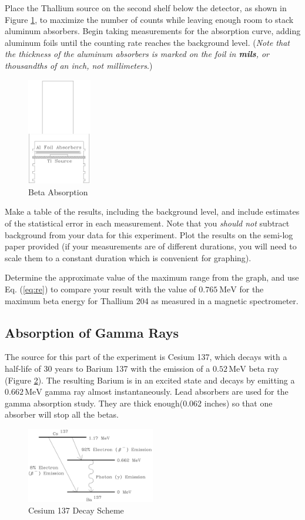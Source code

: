 Place the Thallium source on the second shelf below the detector, as shown in Figure {\ref{fig:absorption}}, to maximize the number of counts while leaving enough room to stack aluminum absorbers. Begin taking measurements for the absorption curve, adding aluminum foils until the counting rate reaches the background level. (\emph{Note that the thickness of the aluminum absorbers is marked on the foil in \textbf{mils}, or thousandths of an inch, not millimeters}.)\myskip
\begin{figure}[h]
\centering
\includegraphics[width=0.25\textwidth]{./Exp10/pic/image8.png}
\caption{Beta Absorption}
\label{fig:absorption}
\end{figure} 

Make a table of the results, including the background level, and include estimates of the statistical error in each measurement. Note that you \emph{should not} subtract background from your data for this experiment. Plot the results on the semi-log paper provided (if your measurements are of different durations, you will need to scale them to a constant duration which is convenient for graphing).\myskip

Determine the approximate value of the maximum range from the graph, and use Eq. ({\ref{eq:re}}) to compare your result with the value of $0.765\ \mathrm{MeV}$ for the maximum beta energy for Thallium 204 as measured in a magnetic spectrometer. 

\subsection{Absorption of Gamma Rays}
The source for this part of the experiment is Cesium 137, which decays with a half-life of 30 years to Barium 137 with the emission of a $0.52\, \mathrm{MeV}$ beta ray (Figure {\ref{fig:cesium}}). The resulting Barium is in an excited state and decays by emitting a $0.662\, \mathrm{MeV}$ gamma ray almost instantaneously. Lead absorbers are used for the gamma absorption study. They are thick enough(0.062 inches) so that one absorber will stop all the betas.\myskip
\begin{figure}[h]
\centering
\includegraphics[width=0.5\textwidth]{./Exp10/pic/image9.png}
\caption{Cesium 137 Decay Scheme}
\label{fig:cesium}
\end{figure} 

